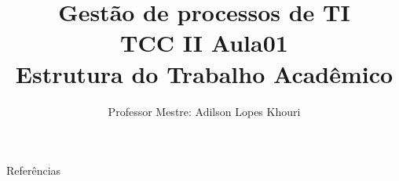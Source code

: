\documentclass[compress, hyperref={pdfpagelayout=SinglePage}]{beamer}
\title[TCC II - Aula 01]{Gestão de processos de TI \\ TCC II Aula01 \\ Estrutura do Trabalho Acadêmico}
\author{Professor Mestre: Adilson Lopes Khouri}
\begin{document}
	\begin{frame}
		\titlepage
	\end{frame}
	
	
	
	
	
	
	
	
	
	
		
	

	
	
	
	
		
	
		
		
		
				
	

	
	
	\begin{frame}{}
		\begin{block}{Referências}
			
	    		
		\end{block}
	\end{frame}
\end{document}
